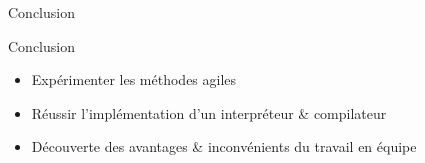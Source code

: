 \begin{chapter}{}{Conclusion}
\end{chapter}

\begin{frame}{Conclusion}
    \begin{block}{}
        \begin{itemize}
            \item Expérimenter les méthodes agiles
            \item Réussir l'implémentation d'un interpréteur \& compilateur
            \item Découverte des avantages \& inconvénients du travail en équipe
        \end{itemize}
    \end{block}
\end{frame}